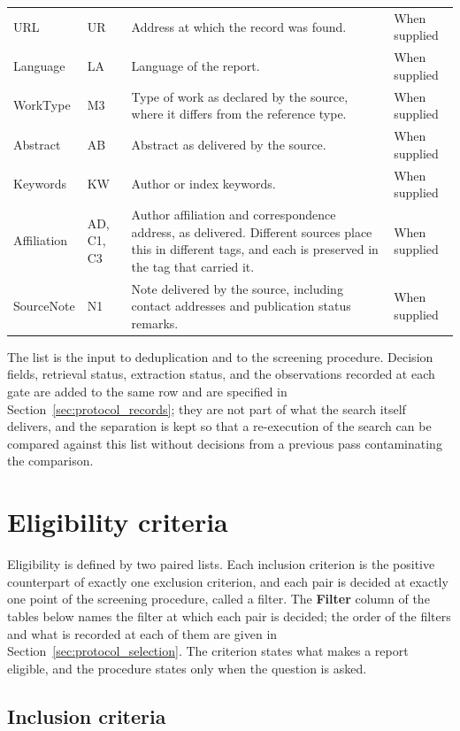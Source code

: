 \begin{longtable}{p{} p{} p{} p{}}
URL & UR & Address at which the record was found. & When supplied \\
Language & LA & Language of the report. & When supplied \\
WorkType & M3 & Type of work as declared by the source, where it differs from the reference type. & When supplied \\
Abstract & AB & Abstract as delivered by the source. & When supplied \\
Keywords & KW & Author or index keywords. & When supplied \\
Affiliation & AD, C1, C3 & Author affiliation and correspondence address, as delivered. Different sources place this in different tags, and each is preserved in the tag that carried it. & When supplied \\
SourceNote & N1 & Note delivered by the source, including contact addresses and publication status remarks. & When supplied \\
\bottomrule
\end{longtable}

The list is the input to deduplication and to the screening procedure. Decision fields, retrieval status, extraction status, and the observations recorded at each gate are added to the same row and are specified in Section~\ref{sec:protocol_records}; they are not part of what the search itself delivers, and the separation is kept so that a re-execution of the search can be compared against this list without decisions from a previous pass contaminating the comparison.

\section{Eligibility criteria}
\label{sec:protocol_eligibility}

Eligibility is defined by two paired lists. Each inclusion criterion is the positive counterpart of exactly one exclusion criterion, and each pair is decided at exactly one point of the screening procedure, called a filter. The \textbf{Filter} column of the tables below names the filter at which each pair is decided; the order of the filters and what is recorded at each of them are given in Section~\ref{sec:protocol_selection}. The criterion states what makes a report eligible, and the procedure states only when the question is asked.

\subsection{Inclusion criteria}

